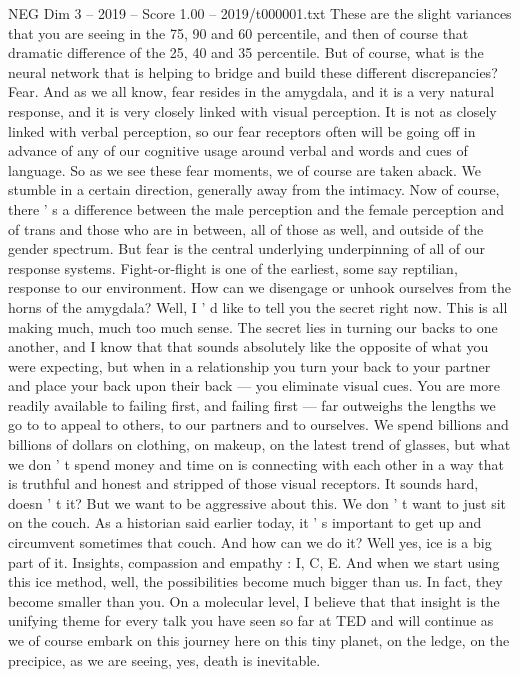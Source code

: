 \begin{textsample}{NEG Dim 3 – 2019 – Score 1.00 – 2019/t000001.txt}
These are the slight variances that you are seeing in the 75, 90 and 60 percentile, and then of course that dramatic difference of the 25, 40 and 35 percentile.
But of course, what is the neural network that is helping to bridge and build these different discrepancies?
Fear.
And as we all know, fear resides in the amygdala, and it is a very natural response, and it is very closely linked with visual perception.
It is not as closely linked with verbal perception, so our fear receptors often will be going off in advance of any of our cognitive usage around verbal and words and cues of language.
So as we see these fear moments, we of course are taken aback.
We stumble in a certain direction, generally away from the intimacy.
Now of course, there ' s a difference between the male perception and the female perception and of trans and those who are in between, all of those as well, and outside of the gender spectrum.
But fear is the central underlying underpinning of all of our response systems.
Fight-or-flight is one of the earliest, some say reptilian, response to our environment.
How can we disengage or unhook ourselves from the horns of the amygdala?
Well, I ' d like to tell you the secret right now.
This is all making much, much too much sense.
The secret lies in turning our backs to one another, and I know that that sounds absolutely like the opposite of what you were expecting, but when in a relationship you turn your back to your partner and place your back upon their back — you eliminate visual cues.
You are more readily available to failing first, and failing first — far outweighs the lengths we go to to appeal to others, to our partners and to ourselves.
We spend billions and billions of dollars on clothing, on makeup, on the latest trend of glasses, but what we don ' t spend money and time on is connecting with each other in a way that is truthful and honest and stripped of those visual receptors.
It sounds hard, doesn ' t it?
But we want to be aggressive about this.
We don ' t want to just sit on the couch.
As a historian said earlier today, it ' s important to get up and circumvent sometimes that couch.
And how can we do it?
Well yes, ice is a big part of it.
Insights, compassion and empathy : I, C, E.
And when we start using this ice method, well, the possibilities become much bigger than us.
In fact, they become smaller than you.
On a molecular level, I believe that that insight is the unifying theme for every talk you have seen so far at TED and will continue as we of course embark on this journey here on this tiny planet, on the ledge, on the precipice, as we are seeing, yes, death is inevitable.

\end{textsample}

